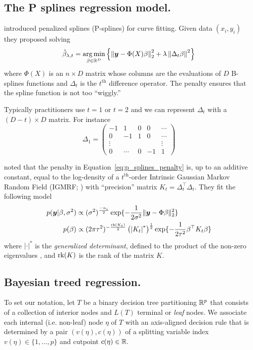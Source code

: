 \subsection{The P splines regression model.}
\citet{EilersMarx1996} introduced penalized splines (P-splines) for curve fitting.
Given data $(x_{i}, y_{i})$ they proposed solving
\begin{equation}
\label{eq:p_splines_penalty}
\hat{\beta}_{\lambda,t} = \operatorname*{arg\,min}_{\beta \in \mathbb{R}^{D}}\left\{\left\lVert \bm{y} - \Phi(X)\beta \right\rVert_{2}^{2} + \lambda\left\lVert \Delta_{t}\beta \right\rVert^{2} \right\}
\end{equation}
where $\Phi(X)$ is an $n \times D$ matrix whose columns are the evaluations of $D$ B-splines functions and $\Delta_{t}$ is the $t^{\text{th}}$ difference operator.
The penalty ensures that the spline function is not too ``wiggly.''

Typically practitioners use $t = 1$ or $t = 2$ and we can represent $\Delta_{t}$ with a $(D - t) \times D$ matrix.
For instance
$$
\Delta_{1} = 
\begin{pmatrix}
-1 & 1 & 0 & 0 &  \cdots\\
0 & -1 & 1 & 0 & \cdots \\
\vdots & ~ &  ~ & ~ &  \vdots \\
0 & \cdots & 0 & -1 & 1 
\end{pmatrix}
$$


\citet{LangBrezger2004} noted that the penalty in Equation~\eqref{eq:p_splines_penalty} is, up to an additive constant, equal to the log-density of a $t^{\text{th}}$-order Intrinsic Gaussian Markov Random Field (IGMRF; \citet{RueHeld2005}) with ``precision'' matrix $K_{t} = \Delta_{t}^{\top}\Delta_{t}.$
They fit the following model
\begin{align}
p(\bm{y} \vert \beta, \sigma^{2}) &\propto (\sigma^{2})^{\frac{-n_{i}}{2}}\exp\{-\frac{1}{2\sigma^{2}}\Vert \bm{y} - \Phi\beta \rVert_{2}^{2}\} \\
p(\beta) &\propto (2\pi\tau^{2})^{-\frac{\text{rk}(K_{t})}{2}}\left(\left\lvert K_{t} \right\rvert^{*}\right)^{\frac{1}{2}}\exp\{-\frac{1}{2\tau^{2}}\beta^{\top}K_{t}\beta\}
\end{align}
where $\lvert \cdot \rvert^{*}$ is the \textit{generalized determinant}, defined to the product of the non-zero eigenvalues \citep{RueHeld2005}, and $\text{rk}(K)$ is the rank of the matrix $K$.

\subsection{Bayesian treed regression.}
To set our notation, let $T$ be a binary decision tree partitioning $\mathbb{R}^{p}$ that consists of a collection of interior nodes and $L(T)$ terminal or \emph{leaf} nodes.
We associate each internal (i.e. non-leaf) node $\eta$ of $T$ with an axis-aligned decision rule that is determined by a pair $(v(\eta),c(\eta))$ of a splitting variable index $v(\eta) \in \{1, \ldots, p\}$ and cutpoint $c(\eta) \in \mathbb{R}.$


